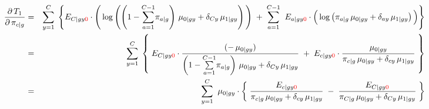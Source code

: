 \begin{eqnarray*}
\dfrac{\partial\,T_{1}}{\partial\,\pi_{c \vert g}}
&=&
	\overset{C}{\underset{y=1}{\sum}}\;
	\left\{
	E_{C \vert gy{\color{red}0}}
	\cdot
	\left(\,
		\overset{{\color{white}.}}{\log}\left(
			\left(1-\overset{C-1}{\underset{a=1}{\sum}}\pi_{a \vert g}\right)\,\mu_{0 \vert gy}
			+
			\delta_{Cy}\,\mu_{1\vert gy}
			\right)
	\,\right)
	\;+\;
	\overset{C-1}{\underset{a=1}{\sum}}\;\;
	E_{a \vert gy{\color{red}0}}
	\cdot
	\left(\,
		\overset{{\color{white}.}}{\log}\left(\pi_{a \vert g}\,\mu_{0 \vert gy} + \delta_{ay}\,\mu_{1\vert gy}\right)
	\,\right)
	\right\}
\\
&=&
	\overset{C}{\underset{y=1}{\sum}}\;
	\left\{\;
	E_{C \vert gy{\color{red}0}}
	\cdot
	\dfrac{(-\,\mu_{0 \vert gy})}{
		\left(1-\overset{C-1}{\underset{a=1}{\sum}}\pi_{a \vert g}\right)\,\mu_{0 \vert gy}+\delta_{Cy}\,\mu_{1\vert gy}
		}
	\;+\;
	E_{c \vert gy{\color{red}0}}
	\cdot
	\dfrac{\mu_{0 \vert gy}}{\pi_{c \vert g}\,\mu_{0 \vert gy} + \delta_{cy}\,\mu_{1\vert gy}}
	\;\right\}
\\
&=&
	\overset{C}{\underset{y=1}{\sum}}\;\;
	\mu_{0 \vert gy}
	\cdot
	\left\{\;
		\dfrac{E_{c \vert gy{\color{red}0}}}{\pi_{c \vert g}\,\mu_{0 \vert gy} + \delta_{cy}\,\mu_{1\vert gy}}
		\;-\;
		\dfrac{E_{C \vert gy{\color{red}0}}}{
			\pi_{C \vert g}\,\mu_{0 \vert gy}+\delta_{Cy}\,\mu_{1\vert gy}
			}
	\;\right\}
\end{eqnarray*}

